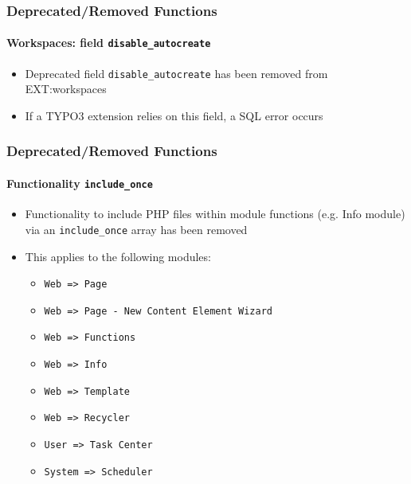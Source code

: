 \begin{frame}[fragile]
	\frametitle{Deprecated/Removed Functions}
	\framesubtitle{Workspaces: field \texttt{disable\_autocreate}}

	\begin{itemize}
		\item Deprecated field \texttt{disable\_autocreate} has been removed from EXT:workspaces
		\item If a TYPO3 extension relies on this field, a SQL error occurs
	\end{itemize}

\end{frame}


\begin{frame}[fragile]
	\frametitle{Deprecated/Removed Functions}
	\framesubtitle{Functionality \texttt{include\_once}}

	\begin{itemize}

		\item Functionality to include PHP files within module functions (e.g. Info module)
			via an \texttt{include\_once} array has been removed

		\item This applies to the following modules:

			\begin{itemize}
				\item \texttt{Web => Page}
				\item \texttt{Web => Page - New Content Element Wizard}
				\item \texttt{Web => Functions}
				\item \texttt{Web => Info}
				\item \texttt{Web => Template}
				\item \texttt{Web => Recycler}
				\item \texttt{User => Task Center}
				\item \texttt{System => Scheduler}
			\end{itemize}

	\end{itemize}

\end{frame}

